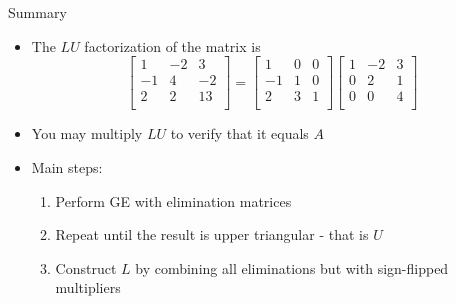 \documentclass[10pt]{beamer}
\begin{document}
\begin{frame}{Summary}
\begin{itemize}
    \item The $LU$ factorization of the matrix is 
    $$
    \begin{bmatrix}
1 & -2 & 3\\
-1 & 4 & -2\\
2 & 2 & 13\\
\end{bmatrix} = 
\begin{bmatrix}
1 & 0 & 0\\
-1 & 1 & 0\\
2 & 3 & 1\\
\end{bmatrix}
\begin{bmatrix}
1 & -2 & 3\\
0 & 2 & 1\\
0 & 0 & 4\\
\end{bmatrix}
    $$
    \item You may multiply $LU$ to verify that it equals $A$\\[3mm]

    \item Main steps:
    \begin{enumerate}
        \item Perform GE with elimination matrices
        \item Repeat until the result is upper triangular - that is $U$
        \item Construct $L$ by combining all eliminations but with sign-flipped multipliers
    \end{enumerate}
\end{itemize}

    
\end{frame}
\end{document}
